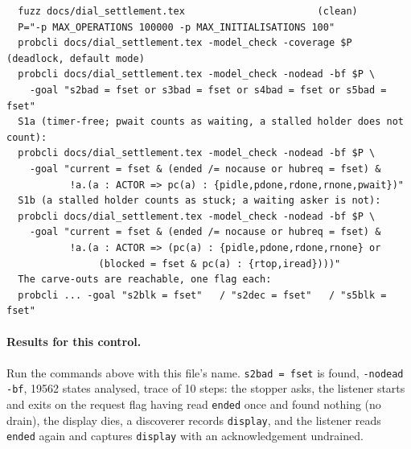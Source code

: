\documentclass[a4paper,10pt,fleqn]{article}
\begin{document}
\begin{verbatim}
  fuzz docs/dial_settlement.tex                       (clean)
  P="-p MAX_OPERATIONS 100000 -p MAX_INITIALISATIONS 100"
  probcli docs/dial_settlement.tex -model_check -coverage $P          (deadlock, default mode)
  probcli docs/dial_settlement.tex -model_check -nodead -bf $P \
    -goal "s2bad = fset or s3bad = fset or s4bad = fset or s5bad = fset"
  S1a (timer-free; pwait counts as waiting, a stalled holder does not count):
  probcli docs/dial_settlement.tex -model_check -nodead -bf $P \
    -goal "current = fset & (ended /= nocause or hubreq = fset) &
           !a.(a : ACTOR => pc(a) : {pidle,pdone,rdone,rnone,pwait})"
  S1b (a stalled holder counts as stuck; a waiting asker is not):
  probcli docs/dial_settlement.tex -model_check -nodead -bf $P \
    -goal "current = fset & (ended /= nocause or hubreq = fset) &
           !a.(a : ACTOR => (pc(a) : {pidle,pdone,rdone,rnone} or
                (blocked = fset & pc(a) : {rtop,iread})))"
  The carve-outs are reachable, one flag each:
  probcli ... -goal "s2blk = fset"   / "s2dec = fset"   / "s5blk = fset"
\end{verbatim}

\paragraph{Results for this control.}
Run the commands above with this file's name.  \texttt{s2bad = fset} is found,
\texttt{-nodead -bf}, 19562 states analysed, trace of 10 steps: the stopper
asks, the listener starts and exits on the request flag having read
\texttt{ended} once and found nothing (no drain), the display dies, a discoverer
records \texttt{display}, and the listener reads \texttt{ended} again and
captures \texttt{display} with an acknowledgement undrained.
\end{document}
